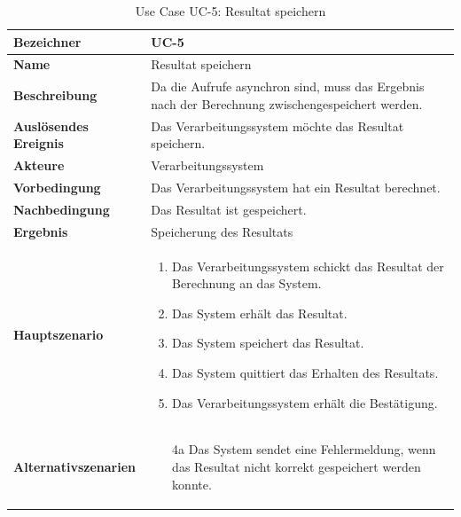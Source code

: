 \begin{table}[ht]
\centering
  \begin{tabular}{ l | p{10cm} }
	\hline
	\rowcolor{gray}
	\textbf{Bezeichner}	&	\textbf{UC-5}\\ \hline
	\textbf{Name}			&	Resultat speichern\\ \hline
	\textbf{Beschreibung}	&	Da die Aufrufe asynchron sind, muss das Ergebnis nach der Berechnung zwischengespeichert werden.\\ \hline
	\textbf{Auslösendes Ereignis}&	Das Verarbeitungssystem möchte das Resultat speichern.\\ \hline
	\textbf{Akteure}		&	Verarbeitungssystem\\ \hline
	\textbf{Vorbedingung}	&	Das Verarbeitungssystem hat ein Resultat berechnet.\\ \hline
	\textbf{Nachbedingung}	&	Das Resultat ist gespeichert.\\ \hline
	\textbf{Ergebnis}		&	Speicherung des Resultats\\ \hline
	\textbf{Hauptszenario}	&	\begin{enumerate}
					\item Das Verarbeitungssystem schickt das Resultat der Berechnung an das System.
					\item Das System erhält das Resultat.
					\item Das System speichert das Resultat.
					\item Das System quittiert das Erhalten des Resultats.
					\item Das Verarbeitungssystem erhält die Bestätigung.
					\end{enumerate}
					\\ \hline
	\textbf{Alternativszenarien}	&	\begin{enumerate}
					\item[4a] Das System sendet eine Fehlermeldung, wenn das Resultat nicht korrekt gespeichert werden konnte.
					\end{enumerate}
					\\ \hline
  \end{tabular}
   \caption{Use Case UC-5: Resultat speichern}\label{table:use_case_5}
\end{table}

